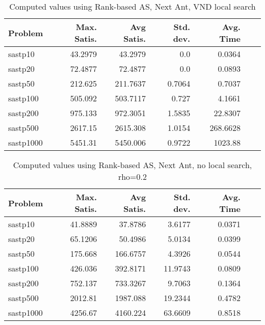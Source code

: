 \documentclass{article}
\begin{document}
\begin{table}[b!]
  \caption{Computed values using Rank-based AS, Next Ant, VND local search}
  \label{tab:conf2}
  \setlength{\tabcolsep}{1.4mm}
  \centering
  \begin{tabular}{lrrrrrr}
    \bfseries Problem &
    \bfseries Max. Satis. &
    \bfseries Avg Satis. &
    \bfseries Std. dev. &
    \bfseries Avg. Time 
    \\\hline
   sastp10 & 43.2979 & 43.2979 & 0.0 & 0.0364 \\ 
   sastp20 & 72.4877 & 72.4877 & 0.0 & 0.0893 \\ 
   sastp50 & 212.625 & 211.7637 & 0.7064 & 0.7037 \\ 
   sastp100 & 505.092 & 503.7117 & 0.727 & 4.1661 \\ 
   sastp200 & 975.133 & 972.3051 & 1.5835 & 22.8307 \\ 
   sastp500 & 2617.15 & 2615.308 & 1.0154 & 268.6628 \\ 
   sastp1000 & 5451.31 & 5450.006 & 0.9722 & 1023.88
    \\\hline
  \end{tabular}

\end{table}


\begin{table}[b!]
  \caption{Computed values using Rank-based AS, Next Ant, no local search, rho=0.2}
  \label{tab:conf3}
  \setlength{\tabcolsep}{1.4mm}
  \centering
  \begin{tabular}{lrrrrrr}
    \bfseries Problem &
    \bfseries Max. Satis. &
    \bfseries Avg Satis. &
    \bfseries Std. dev. &
    \bfseries Avg. Time 
    \\\hline
    sastp10 & 41.8889 & 37.8786 & 3.6177 & 0.0371 \\ 
    sastp20 & 65.1206 & 50.4986 & 5.0134 & 0.0399 \\ 
    sastp50 & 175.668 & 166.6757 & 4.3926 & 0.0544 \\ 
    sastp100 & 426.036 & 392.8171 & 11.9743 & 0.0809 \\ 
    sastp200 & 752.137 & 733.3267 & 9.7063 & 0.1364 \\ 
    sastp500 & 2012.81 & 1987.088 & 19.2344 & 0.4782 \\ 
    sastp1000 & 4256.67 & 4160.224 & 63.6609 & 0.8518

    \\\hline
  \end{tabular}

\end{table}
\end{document}
